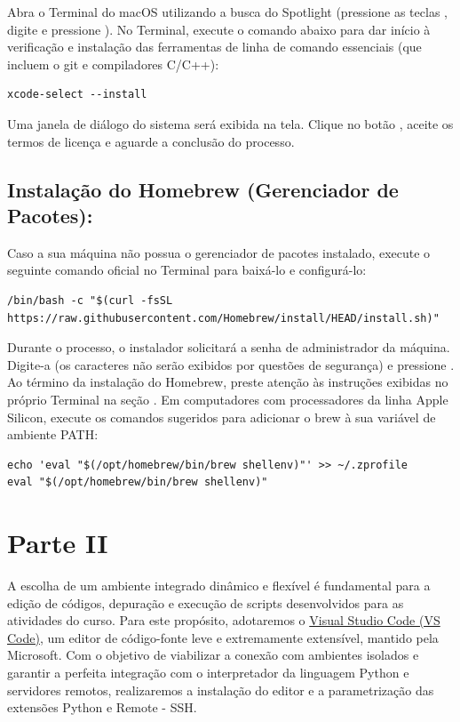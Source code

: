 Abra o Terminal do macOS utilizando a busca do Spotlight (pressione as teclas , digite  e pressione ). No Terminal, execute o comando abaixo para dar início à verificação e instalação das ferramentas de linha de comando essenciais (que incluem o git e compiladores C/C++):
\vspace{0.3cm}
\begin{lstlisting}
xcode-select --install
\end{lstlisting}

Uma janela de diálogo do sistema será exibida na tela. Clique no botão , aceite os termos de licença e aguarde a conclusão do processo.

\subsection*{Instalação do Homebrew (Gerenciador de Pacotes):}

Caso a sua máquina não possua o gerenciador de pacotes  instalado, execute o seguinte comando oficial no Terminal para baixá-lo e configurá-lo:

\vspace{0.3cm}
\begin{lstlisting}
/bin/bash -c "$(curl -fsSL https://raw.githubusercontent.com/Homebrew/install/HEAD/install.sh)"
\end{lstlisting}


Durante o processo, o instalador solicitará a senha de administrador da máquina. Digite-a (os caracteres não serão exibidos por questões de segurança) e pressione . Ao término da instalação do Homebrew, preste atenção às instruções exibidas no próprio Terminal na seção . Em computadores com processadores da linha Apple Silicon, execute os comandos sugeridos para adicionar o brew à sua variável de ambiente PATH:

\vspace{0.3cm}

\begin{lstlisting}
echo 'eval "$(/opt/homebrew/bin/brew shellenv)"' >> ~/.zprofile
eval "$(/opt/homebrew/bin/brew shellenv)"
\end{lstlisting}


\section*{Parte II}

A escolha de um ambiente integrado dinâmico e flexível é fundamental para a edição de códigos, depuração e execução de scripts desenvolvidos para as atividades do curso. Para este propósito, adotaremos o \href{https://code.visualstudio.com}{Visual Studio Code (VS Code)}, um editor de código-fonte leve e extremamente extensível, mantido pela Microsoft.
Com o objetivo de viabilizar a conexão com ambientes isolados e garantir a perfeita integração com o interpretador da linguagem Python e servidores remotos, realizaremos a instalação do editor e a parametrização das extensões Python e Remote - SSH.

